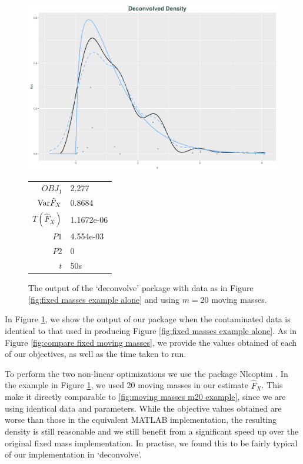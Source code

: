 \begin{figure}
	\centering
	\includegraphics[width = \textwidth]{Figures/Deconvolution/R_example.png}
	\begin{tabular}{r l}
			$OBJ_1$ & 2.277\\
			$\mathrm{Var} \hat{F}_X$ & 0.8684\\
			$T(\hat{F}_X)$ & 1.1672e-06\\
			$P1$ & 4.554e-03\\
			$P2$ & 0\\
			$t$ & 50s
		\end{tabular}
	\caption{The output of the `deconvolve' package with data as in Figure \ref{fig:fixed masses example alone} and using $m=20$ moving masses.}
	\label{fig:R example}
\end{figure}

In Figure \ref{fig:R example}, we show the output of our package when the contaminated data is identical to that used in producing Figure \ref{fig:fixed masses example alone}. As in Figure \ref{fig:compare fixed moving masses}, we provide the values obtained of each of our objectives, as well as the time taken to run.

To perform the two non-linear optimizations we use the package Nlcoptim \cite{Chen2017-mn}. In the example in Figure \ref{fig:R example}, we used 20 moving masses in our estimate $\hat{F}_X$. This make it directly comparable to \ref{fig:moving masses m20 example}, since we are using identical data and parameters. While the objective values obtained are worse than those in the equivalent MATLAB implementation, the resulting density is still reasonable and we still benefit from a significant speed up over the original fixed mass implementation. In practise, we found this to be fairly typical of our implementation in `deconvolve'. 

